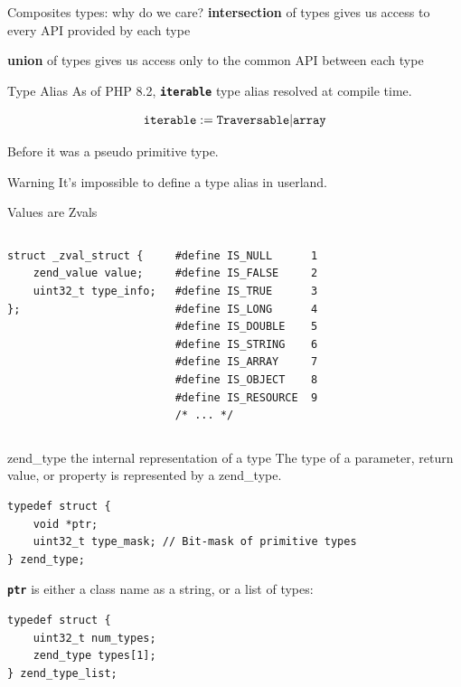 \documentclass[aspectratio=169]{beamer}
\newcommand{\type}[1]{\texttt{\textbf{#1}}}
\begin{document}
\begin{frame}{Composites types: why do we care?}
    \textbf{intersection} of types gives us access to \alert{every} API provided by each type

    \textbf{union} of types gives us access \alert{only} to the common API between each type
\end{frame}

\begin{frame}{Type Alias}
    As of PHP 8.2, \type{iterable} type alias resolved at compile time.

    \begin{displaymath}
        \text{\texttt{iterable}} := \text{\texttt{Traversable}}|\text{\texttt{array}} 
    \end{displaymath}

    Before it was a pseudo primitive type.
    
    \begin{alertblock}{Warning}
        It's impossible to define a type alias in userland.
    \end{alertblock}
\end{frame}

\begin{frame}[fragile]{Values are Zvals}
\begin{center}
    \begin{columns}
        \begin{verbatim}
struct _zval_struct {
    zend_value value;
    uint32_t type_info;
};
        \end{verbatim}

        \begin{verbatim}
#define IS_NULL      1
#define IS_FALSE     2
#define IS_TRUE      3
#define IS_LONG      4
#define IS_DOUBLE    5
#define IS_STRING    6
#define IS_ARRAY     7
#define IS_OBJECT    8
#define IS_RESOURCE  9
/* ... */
        \end{verbatim}
    \end{columns}
\end{center}
\end{frame}

\begin{frame}[fragile]{zend\_type the internal representation of a type}
    The type of a parameter, return value, or property is represented by a \alert{zend\_type}.
    \begin{verbatim}
typedef struct {
    void *ptr;
    uint32_t type_mask; // Bit-mask of primitive types
} zend_type;
    \end{verbatim}
    \texttt{\textbf{ptr}} is either a class name as a string, or a list of types:
    \begin{verbatim}
typedef struct {
    uint32_t num_types;
    zend_type types[1];
} zend_type_list;
    \end{verbatim}
\end{frame}
\end{document}

